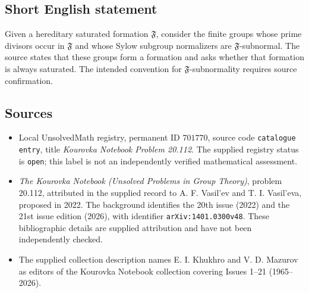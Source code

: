 \documentclass[11pt]{article}
\begin{document}
\subsection{Short English statement}
Given a hereditary saturated formation \(\mathfrak F\), consider the finite groups whose prime divisors occur in \(\mathfrak F\) and whose Sylow subgroup normalizers are \(\mathfrak F\)-subnormal. The source states that these groups form a formation and asks whether that formation is always saturated. The intended convention for \(\mathfrak F\)-subnormality requires source confirmation.
\subsection{Sources}
\begin{itemize}
\item Local UnsolvedMath registry, permanent ID \(701770\), source code \texttt{catalogue entry}, title \emph{Kourovka Notebook Problem 20.112}. The supplied registry status is \texttt{open}; this label is not an independently verified mathematical assessment.
\item \emph{The Kourovka Notebook (Unsolved Problems in Group Theory)}, problem 20.112, attributed in the supplied record to A. F. Vasil'ev and T. I. Vasil'eva, proposed in 2022. The background identifies the 20th issue (2022) and the 21st issue edition (2026), with identifier \texttt{arXiv:1401.0300v48}. These bibliographic details are supplied attribution and have not been independently checked.
\item The supplied collection description names E. I. Khukhro and V. D. Mazurov as editors of the Kourovka Notebook collection covering Issues 1--21 (1965--2026).
\end{itemize}
\end{document}
